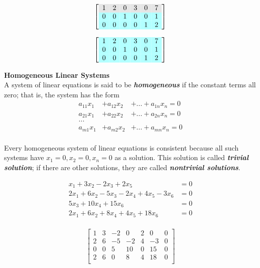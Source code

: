 \documentclass[a4paper, 12pt]{article}
\begin{document}
\begin{enumerate}
\[ \left[ {\begin{array}{cccccc} 
\rowcolor{Gray}
1 & 2 & 0 & 3 & 0 & 7 \\ 
\rowcolor{LightCyan}
0 & 0 & 1  & 0 & 0 & 1\\
\rowcolor{LightCyan}
0 & 0 & 0  & 0 & 1  & 2 
\end{array}} \right] \]

\[ \left[ {\begin{array}{cccccc} 
\rowcolor{LightCyan}
1 & 2 & 0 & 3 & 0 & 7 \\ 
\rowcolor{LightCyan}
0 & 0 & 1  & 0 & 0 & 1\\
\rowcolor{LightCyan}
0 & 0 & 0  & 0 & 1  & 2 
\end{array}} \right] \]

\end{enumerate}

\textbf{Homogeneous Linear Systems} \\
A system of linear equations is said to be \textbf{\textit{homogeneous}} if 
the constant terms all zero; that is, the system has the form
\begin{eqnarray*}
a_{11}x_1  &+ a_{12}x_2 &+ ... + a_{1n}x_n = 0\\
a_{21}x_1  &+ a_{22}x_2 &+ ... + a_{2n}x_n = 0\\
...\\
a_{m1}x_1  &+ a_{m2}x_2 &+ ... + a_{mn}x_n = 0\\
\end{eqnarray*}

Every homogeneous system of linear equations is consistent because
all such systems have $x_1 = 0, x_2 = 0, x_n = 0$ as a solution.
This solution is called \textbf{\textit{trivial solution}}; if there
are other solutions, they are called \textbf{\textit{nontrivial solutions}}.

\begin{align*}
x_1 + 3x_2 - 2x_3 + 2x_5 &= 0 \\
2x_1 + 6x_2 - 5x_3 - 2x_4 + 4x_5 - 3x_6 &= 0\\
5x_3 + 10x_4 + 15x_6 &= 0\\
2x_1 + 6x_2 + 8x_4 + 4x_5 + 18x_6 &= 0 \\
\end{align*}

\[ \left[
\begin{array}{ccccccc} 
1 & 3 & -2 &  0 & 2 &  0 & 0\\
2 & 6 & -5 & -2 & 4 & -3 & 0\\
0 & 0 &  5 & 10 & 0 & 15 & 0\\
2 & 6 &  0 &  8 & 4 & 18 & 0\\ 
\end{array} 
\right] \] 
\end{document}
